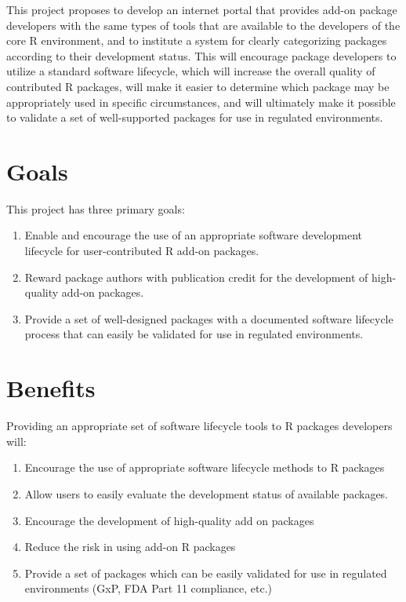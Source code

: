 \documentclass[12pt]{article}
\begin{document}
This project proposes to develop an internet portal that provides
add-on package developers with the same types of tools that are
available to the developers of the core R environment, and to
institute a system for clearly categorizing packages according to
their development status.  This will encourage package developers to
utilize a standard software lifecycle, which will increase the overall
quality of contributed R packages, will make it easier to determine
which package may be appropriately used in specific circumstances, and
will ultimately make it possible to validate a set of well-supported
packages for use in regulated environments.


\section{Goals}

This project has three primary goals:

\begin{enumerate}
\item Enable and encourage the use of an appropriate software
  development lifecycle for user-contributed R add-on packages.

\item Reward package authors with publication credit for the
  development of high-quality add-on packages.

\item Provide a set of well-designed packages with a documented
  software lifecycle process that can easily be validated for use in
  regulated environments.

\end{enumerate}

\section{Benefits}

Providing an appropriate set of software lifecycle tools to R packages
developers will:
\begin{enumerate}
\item Encourage the use of appropriate software lifecycle methods to R
  packages
\item Allow users to easily evaluate the development status of
  available packages.
\item Encourage the development of high-quality add on packages
\item Reduce the risk in using add-on R packages
\item Provide a set of packages which can be easily validated for use
  in regulated environments (GxP, FDA Part 11 compliance, etc.)
\end{enumerate}
\end{document}
